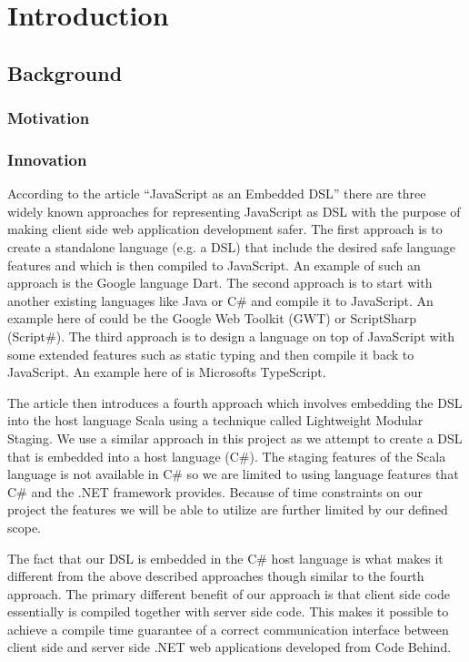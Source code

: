\chapter{Introduction}

\section{Background}
	\subsection{Motivation}
	
	\subsection{Innovation}
		According to the article “JavaScript as an Embedded DSL” there are three widely known approaches for representing JavaScript as DSL with the purpose of making client side web application development safer. The first approach is to create a standalone language (e.g. a DSL) that include the desired safe language features and which is then compiled to JavaScript. An example of such an approach is the Google language Dart. The second approach is to start with another existing languages like Java or C\# and compile it to JavaScript. An example here of could be the Google Web Toolkit (GWT) or ScriptSharp (Script\#). The third approach is to design a language on top of JavaScript with some extended features such as static typing and then compile it back to JavaScript. An example here of is Microsofts TypeScript.

		The article then introduces a fourth approach which involves embedding the DSL into the host language Scala using a technique called Lightweight Modular Staging. We use a similar approach in this project as we attempt to create a DSL that is embedded into a host language (C\#). The staging features of the Scala language is not available in C\# so we are limited to using language features that C\# and the .NET framework provides. Because of time constraints on our project the features we will be able to utilize are further limited by our defined scope.

		The fact that our DSL is embedded in the C\# host language is what makes it different from the above described approaches though similar to the fourth approach. The primary different benefit of our approach is that client side code essentially is compiled together with server side code. This makes it possible to achieve a compile time guarantee of a correct communication interface between client side and server side .NET web applications developed from Code Behind.


